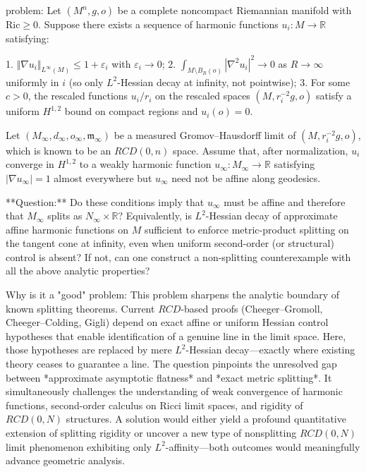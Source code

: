 problem:  
Let \((M^n,g,o)\) be a complete noncompact Riemannian manifold with \(\mathrm{Ric}\ge0\).  
Suppose there exists a sequence of harmonic functions \(u_i:M\to\mathbb{R}\) satisfying:  

1. \( \Vert \nabla u_i\Vert_{L^\infty(M)} \le 1+\varepsilon_i \) with \(\varepsilon_i\to 0\);  
2. \( \int_{M\setminus B_R(o)} |\nabla^2 u_i|^2 \to 0\) as \(R\to\infty\) uniformly in \(i\) (so only \(L^2\)-Hessian decay at infinity, not pointwise);  
3. For some \(c>0\), the rescaled functions \(u_i/r_i\) on the rescaled spaces \((M,r_i^{-2}g,o)\) satisfy a uniform \(H^{1,2}\) bound on compact regions and \(u_i(o)=0\).  

Let \((M_\infty,d_\infty,o_\infty,\mathfrak{m}_\infty)\) be a measured Gromov–Hausdorff limit of \((M,r_i^{-2}g,o)\), which is known to be an \(RCD(0,n)\) space. Assume that, after normalization, \(u_i\) converge in \(H^{1,2}\) to a weakly harmonic function \(u_\infty : M_\infty\to\mathbb{R}\) satisfying  
\(|\nabla u_\infty|=1\) almost everywhere but \(u_\infty\) need not be affine along geodesics.

**Question:**  
Do these conditions imply that \(u_\infty\) must be affine and therefore that \(M_\infty\) splits as \(N_\infty\times \mathbb{R}\)?  
Equivalently, is \(L^2\)-Hessian decay of approximate affine harmonic functions on \(M\) sufficient to enforce metric-product splitting on the tangent cone at infinity, even when uniform second-order (or structural) control is absent?  
If not, can one construct a non-splitting counterexample with all the above analytic properties?

Why is it a "good" problem:  
This problem sharpens the analytic boundary of known splitting theorems. Current \(RCD\)-based proofs (Cheeger–Gromoll, Cheeger–Colding, Gigli) depend on exact affine or uniform Hessian control hypotheses that enable identification of a genuine line in the limit space. Here, those hypotheses are replaced by mere \(L^2\)-Hessian decay—exactly where existing theory ceases to guarantee a line. The question pinpoints the unresolved gap between *approximate asymptotic flatness* and *exact metric splitting*. It simultaneously challenges the understanding of weak convergence of harmonic functions, second-order calculus on Ricci limit spaces, and rigidity of \(RCD(0,N)\) structures. A solution would either yield a profound quantitative extension of splitting rigidity or uncover a new type of nonsplitting \(RCD(0,N)\) limit phenomenon exhibiting only \(L^2\)-affinity—both outcomes would meaningfully advance geometric analysis.